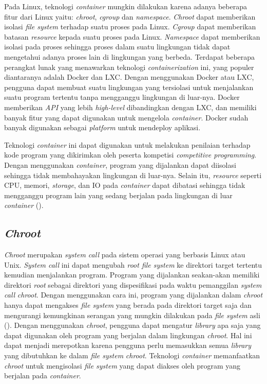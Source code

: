 \par Pada Linux, teknologi \textit{container} mungkin dilakukan karena adanya beberapa fitur dari Linux yaitu: \textit{chroot}, \textit{cgroup} dan \textit{namespace}. \textit{Chroot} dapat memberikan isolasi \textit{file system} terhadap suatu proses pada Linux. \textit{Cgroup} dapat memberikan batasan \textit{resource} kepada suatu proses pada Linux. \textit{Namespace} dapat memberikan isolasi pada proses sehingga proses dalam suatu lingkungan tidak dapat mengetahui adanya proses lain di lingkungan yang berbeda. Terdapat beberapa perangkat lunak yang menawarkan teknologi \textit{containerization} ini, yang populer diantaranya adalah Docker dan LXC. Dengan menggunakan Docker atau LXC, pengguna dapat membuat suatu lingkungan yang tersiolasi untuk menjalankan suatu program tertentu tanpa mengganggu lingkungan di luar-nya. Docker memberikan \textit{API} yang lebih \textit{high-level} dibandingkan dengan LXC, dan memiliki banyak fitur yang dapat digunakan untuk mengelola \textit{container}. Docker sudah banyak digunakan sebagai \textit{platform} untuk mendeploy aplikasi.

\par Teknologi \textit{container} ini dapat digunakan untuk melakukan penilaian terhadap kode program yang dikirimkan oleh peserta kompetisi \textit{competitive programming}. Dengan menggunakan \textit{container}, program yang dijalankan dapat diisolasi sehingga tidak membahayakan lingkungan di luar-nya. Selain itu, \textit{resource} seperti CPU, memori, \textit{storage}, dan IO pada \textit{container} dapat dibatasi sehingga tidak mengganggu program lain yang sedang berjalan pada lingkungan di luar \textit{container} (\cite{merkeldocker}).

\subsection{\textit{Chroot}}

\par \textit{Chroot} merupakan \textit{system call} pada sistem operasi yang berbasis Linux atau Unix. \textit{System call} ini dapat mengubah \textit{root file system} ke direktori target tertentu kemudian menjalankan program. Program yang dijalankan seakan-akan memiliki direktori \textit{root} sebagai direktori yang dispesifikasi pada waktu pemanggilan \textit{system call} \textit{chroot}. Dengan menggunakan cara ini, program yang dijalankan dalam \textit{chroot} hanya dapat mengakses \textit{file system} yang berada pada direktori target saja dan mengurangi kemungkinan serangan yang mungkin dilakukan pada \textit{file system} asli (\cite{lessardchroot}). Dengan menggunakan \textit{chroot}, pengguna dapat mengatur \textit{library} apa saja yang dapat digunakan oleh program yang berjalan dalam lingkungan \textit{chroot}. Hal ini dapat menjadi merepotkan karena pengguna perlu memasukkan semua \textit{library} yang dibutuhkan ke dalam \textit{file system} \textit{chroot}. Teknologi \textit{container} memanfaatkan \textit{chroot} untuk mengisolasi \textit{file system} yang dapat diakses oleh program yang berjalan pada \textit{container}.

